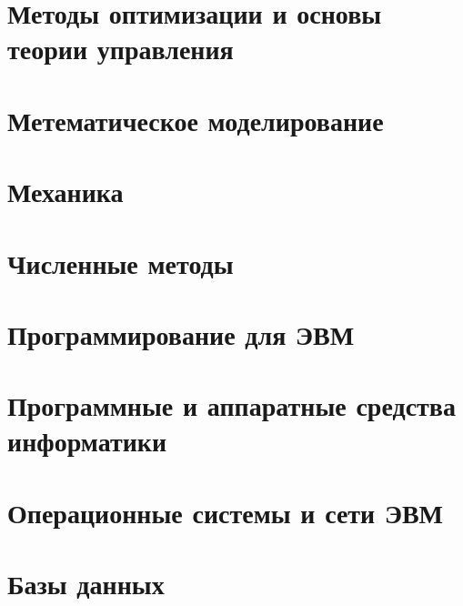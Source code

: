 \documentclass[12pt]{report}
\theoremstyle{plain}
\begin{document}
\chapter{Методы оптимизации и основы теории управления}

\chapter{Метематическое моделирование}

\chapter{Механика}

\chapter{Численные методы}

\chapter{Программирование для ЭВМ}

\chapter{Программные и аппаратные средства информатики}

\chapter{Операционные системы и сети ЭВМ}

\chapter{Базы данных}
\end{document}
